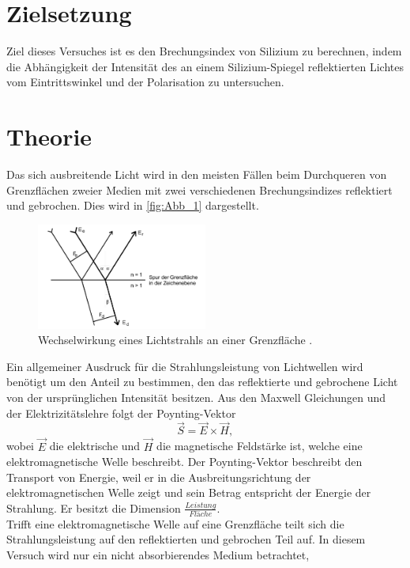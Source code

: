 \section{Zielsetzung}
\label{sec:Zielsetzung}
Ziel dieses Versuches ist es den Brechungsindex von Silizium zu berechnen, indem die
Abhängigkeit der Intensität des an einem Silizium-Spiegel reflektierten Lichtes vom 
Eintrittswinkel und der Polarisation zu untersuchen.
\section{Theorie}
\label{sec:Theorie}
Das sich ausbreitende Licht wird in den meisten Fällen beim Durchqueren von Grenzflächen zweier
Medien mit zwei verschiedenen Brechungsindizes reflektiert und gebrochen. Dies wird in \autoref{fig:Abb_1} dargestellt.
\begin{figure}[H]
    \centering
    \includegraphics[width=0.5\textwidth]{Abbildung/Abb_1.png}
    \caption {Wechselwirkung eines Lichtstrahls an einer Grenzfläche \cite[42]{V407}.}
    \label{fig:Abb_1}
\end{figure}
Ein allgemeiner Ausdruck für die Strahlungsleistung von Lichtwellen wird benötigt um den Anteil zu bestimmen,
den das reflektierte und gebrochene Licht von der ursprünglichen Intensität besitzen.
Aus den Maxwell Gleichungen und der Elektrizitätslehre folgt der Poynting-Vektor
\begin{equation*}
    \vec{S} = \vec{E} \times \vec{H},
    \label{eqn:Poynting}
\end{equation*}
wobei $\vec{E}$ die elektrische und $\vec{H}$ die magnetische Feldstärke ist, welche eine
elektromagnetische Welle beschreibt. Der Poynting-Vektor beschreibt den Transport von Energie,
weil er in die Ausbreitungsrichtung der elektromagnetischen Welle zeigt und sein Betrag entspricht
der Energie der Strahlung. Er besitzt die Dimension $\frac{Leistung}{Fläche}$.\\
Trifft eine elektromagnetische Welle auf eine Grenzfläche teilt sich die Strahlungsleistung auf den 
reflektierten und gebrochen Teil auf. In diesem Versuch wird nur ein nicht absorbierendes Medium betrachtet,
